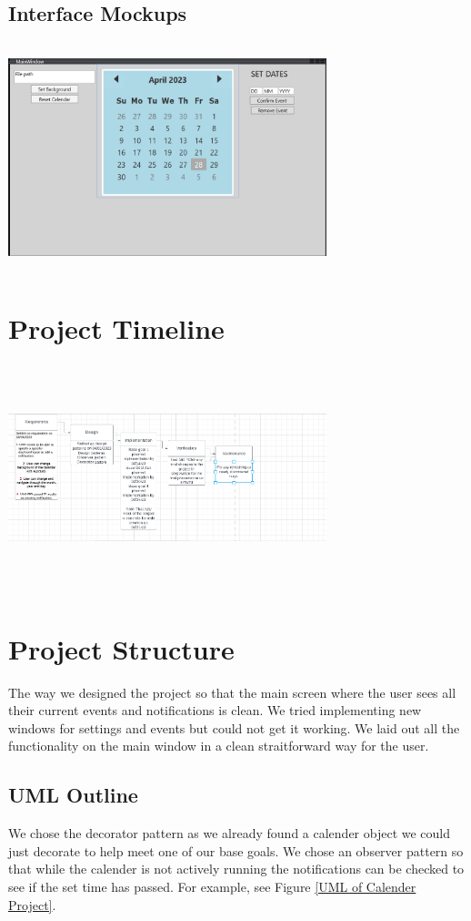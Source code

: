 \documentclass[10pt,conference,onecolumn,compsoc]{IEEEtran}
\begin{document}
\subsection{Interface Mockups}
\includegraphics[height=250px, width=350px]{gui.png}
\label{GUI Mockup}




\section{Project Timeline}
\includegraphics[height=250px, width=350px]{Roadmap.png}

\section{Project Structure}
The way we designed the project so that the main screen where the user sees all their current events and notifications is clean. We tried implementing new windows for settings and events but could not get it working. We laid out all the functionality on the main window in a clean straitforward way for the user. 

\subsection{UML Outline}
We chose the decorator pattern as we already found a calender object we could just decorate to help meet one of our base goals. We chose an observer pattern so that while the calender is not actively running the notifications can be checked to see if the set time has passed.  
For example, see Figure \ref{UML of Calender Project}.
\end{document}

